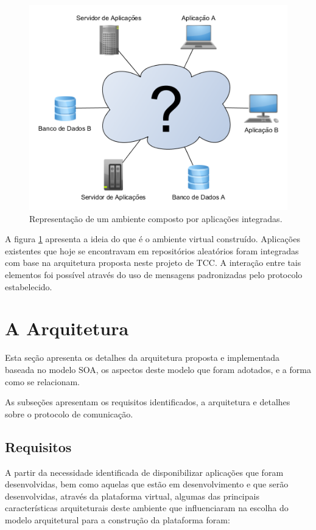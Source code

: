 \begin{figure}[!hbt]
\centering
\includegraphics[scale=0.7]{figuras/ambiente_virtual.png}
\caption{Representação de um ambiente composto por aplicações integradas.}
\label{ambiente_virtual}
\end{figure}

A figura \ref{ambiente_virtual} apresenta a ideia do que é o ambiente virtual construído. Aplicações existentes que hoje se encontravam em repositórios aleatórios foram integradas com base na arquitetura proposta neste projeto de TCC. A interação entre tais elementos foi possível através do uso de mensagens padronizadas pelo protocolo estabelecido.

\section{A Arquitetura}

Esta seção apresenta os detalhes da arquitetura proposta e implementada baseada no modelo SOA, os aspectos deste modelo que foram adotados, e a forma como se relacionam.

As subseções apresentam os requisitos identificados, a arquitetura e detalhes sobre o protocolo de comunicação.

\subsection{Requisitos}
A partir da necessidade identificada de disponibilizar aplicações que foram desenvolvidas, bem como aquelas que estão em desenvolvimento e que serão desenvolvidas, através da plataforma virtual, algumas das principais características arquiteturais deste ambiente que influenciaram na escolha do modelo arquitetural para a construção da plataforma foram:

